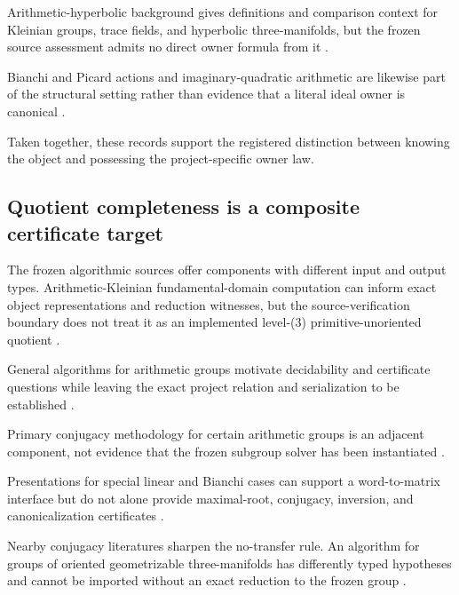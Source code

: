 \documentclass[11pt,a4paper]{article}
\begin{document}
Arithmetic-hyperbolic background gives definitions and comparison context for Kleinian groups, trace fields, and hyperbolic three-manifolds, but the frozen source assessment admits no direct owner formula from it
\citep{P29-S17}.

Bianchi and Picard actions and imaginary-quadratic arithmetic are likewise part of the structural setting rather than evidence that a literal ideal owner is canonical
\citep{P29-S18}.

Taken together, these records support the registered distinction between knowing the object and possessing the project-specific owner law.

\subsection{Quotient completeness is a composite certificate target}

The frozen algorithmic sources offer components with different input and output types. Arithmetic-Kleinian fundamental-domain computation can inform exact object representations and reduction witnesses, but the source-verification boundary does not treat it as an implemented level-(3) primitive-unoriented quotient
\citep{P29-S10}.

General algorithms for arithmetic groups motivate decidability and certificate questions while leaving the exact project relation and serialization to be established
\citep{P29-S11}.

Primary conjugacy methodology for certain arithmetic groups is an adjacent component, not evidence that the frozen subgroup solver has been instantiated
\citep{P29-S15}.

Presentations for special linear and Bianchi cases can support a word-to-matrix interface but do not alone provide maximal-root, conjugacy, inversion, and canonicalization certificates
\citep{P29-S16}.

Nearby conjugacy literatures sharpen the no-transfer rule. An algorithm for groups of oriented geometrizable three-manifolds has differently typed hypotheses and cannot be imported without an exact reduction to the frozen group
\citep{P29-S12}.
\end{document}
